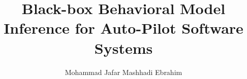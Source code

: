\author{Mohammad Jafar Mashhadi Ebrahim}
\title{Black-box Behavioral Model Inference for Auto-Pilot Software Systems}




\makethesistitle
